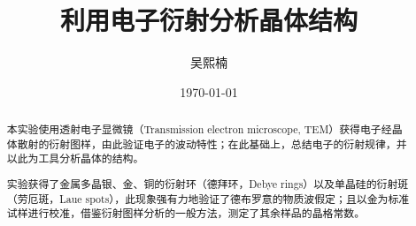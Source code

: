 \documentclass[aps,pre,12pt,preprint,%
	onecolumn,showpacs,showkeys,nofootinbib]{revtex4-2}
\begin{document}
	\title{%
	\texstringonly{\hfil\\[2\baselineskip]}
	\sf\LARGE%
		利用电子衍射分析晶体结构%
	\texstringonly{\vspace{3ex}}}
	\author{\fangsong\large%
		吴熙楠%
	\vspace{2mm}}
	\date{\today}
	
\begin{abstract}
\vspace{10mm}
\begin{spacing}{1.5}\normalsize
\setlength{\parskip}{.3\baselineskip}
%	
	本实验使用透射电子显微镜（Transmission electron microscope, TEM）获得电子经晶体散射的衍射图样，由此验证电子的波动特性；在此基础上，总结电子的衍射规律，并以此为工具分析晶体的结构。
	
	实验获得了金属多晶银、金、铜的衍射环（德拜环，Debye rings）以及单晶硅的衍射斑（劳厄斑，Laue spots），此现象强有力地验证了德布罗意的物质波假定；且以金为标准试样进行校准，借鉴衍射图样分析的一般方法，测定了其余样品的晶格常数。
\end{spacing}
\end{abstract}
\clearpage
\maketitle
\thispagestyle{titlepagestyle}
%

\newpage
\end{document}
